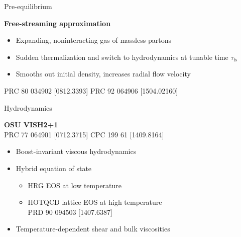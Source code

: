 \documentclass{beamer}
\begin{document}
\begin{frame}[t]{Pre-equilibrium}
  \begin{center}
    \bf Free-streaming approximation
  \end{center}
  \begin{itemize}
    \setlength{\itemsep}{1ex}
    \item Expanding, noninteracting gas of massless partons
    \item Sudden thermalization and switch to hydrodynamics at tunable time $\tau_\text{fs}$
    \item Smooths out initial density, increases radial flow velocity
  \end{itemize}
  \tiny\flushright PRC 80 034902 [0812.3393] \quad PRC 92 064906 [1504.02160]
\end{frame}

\begin{frame}[t]{Hydrodynamics}
  \vspace{-1ex}
  \begin{center}
    {\bf OSU VISH2+1} \\[1ex]
    \tiny
    PRC 77 064901 [0712.3715] \quad
    CPC 199 61 [1409.8164]
  \end{center}
  \vspace{-1ex}
  \begin{itemize}
    \setlength{\itemsep}{1ex}
    \item Boost-invariant viscous hydrodynamics
    \item Hybrid equation of state
      \begin{itemize}
        \item HRG EOS at low temperature
        \item HOTQCD lattice EOS at high temperature \\
          {\tiny PRD 90 094503 [1407.6387]}
      \end{itemize}
    \item Temperature-dependent shear and bulk viscosities
  \end{itemize}
\end{frame}
\end{document}
